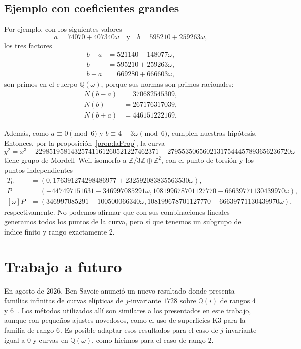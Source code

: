 \documentclass[a4paper]{book}
\theoremstyle{definition}
\theoremstyle{plain}
\newcommand{\nbd}{\nobreakdash}
\newcommand{\QQ}{\mathbb{Q}}
\newcommand{\ZZ}{\mathbb{Z}}
\begin{document}
\subsection*{Ejemplo con coeficientes grandes}

Por ejemplo, con los siguientes valores 
\[
a=74070+407340\omega \quad \text{y}\quad b=595210+259263\omega,
\]
los tres factores
\[
\begin{aligned}
b-a&=521140-148077\omega,\\
b&=595210+259263\omega,\\
b+a&=669280+666603\omega,
\end{aligned}
\]
son primos en el cuerpo $\QQ(\omega)$, porque sus normas son primos racionales:
\[
\begin{aligned}
N(b-a)&=370682545309,\\
N(b)&=267176317039,\\
N(b+a)&=446151222169.
\end{aligned}
\]

Además, como $a\equiv 0\pmod 6$ y $b\equiv 4+3 \omega \pmod6$, cumplen nuestras hipótesis. Entonces, por la proposición~\ref{prop:laProp}, la curva
\[
y^2=x^3-22985195814325741161260521227462371
+27955350656021317544457893656236720\omega
\]
tiene grupo de Mordell--Weil isomorfo a $\ZZ/3\ZZ\oplus\ZZ^2$, con el punto de torsión y los puntos independientes
\[
\begin{aligned}
T_0&=(0,176391274298486977+232592083835563530\omega), \\
P&=(-447497151631-346997085291\omega, 108199678701127770-66639771130439970\omega), \\
[\omega]P&=( 346997085291-100500066340\omega,108199678701127770-66639771130439970\omega),
\end{aligned}
\]
respectivamente. No podemos afirmar que con sus combinaciones lineales generamos todos los puntos de la curva, pero sí que tenemos un subgrupo de índice finito y rango exactamente 2.

\section{Trabajo a futuro}

En agosto de 2026, Ben Savoie anunció un nuevo resultado donde presenta familias infinitas de curvas elípticas de $j$\nbd-invariante $1728$ sobre $\QQ(i)$ de rangos 4 y 6~\cite{Savoie2026QiRanks4And6}. Los métodos utilizados allí son similares a los presentados en este trabajo, aunque con pequeños ajustes novedosos, como el uso de superficies K3 para la familia de rango 6. Es posible adaptar esos resultados para el caso de $j$\nbd-invariante igual a $0$ y curvas en $\QQ(\omega)$, como hicimos para el caso de rango $2$. 
\end{document}
